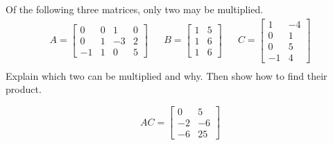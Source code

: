 
\begin{exerciseStatement}


Of the following three matrices, only two may be multiplied. 
\begin{align*} A= \left[\begin{array}{cccc}
0 & 0 & 1 & 0 \\
0 & 1 & -3 & 2 \\
-1 & 1 & 0 & 5
\end{array}\right]  & & B= \left[\begin{array}{cc}
1 & 5 \\
1 & 6 \\
1 & 6
\end{array}\right]  & & C= \left[\begin{array}{cc}
1 & -4 \\
0 & 1 \\
0 & 5 \\
-1 & 4
\end{array}\right]  \\ \end{align*}
             Explain which two can be multiplied and why. Then show how to find their product.


\end{exerciseStatement}
    
\begin{exerciseAnswer} 
\[AC= \left[\begin{array}{cc}
0 & 5 \\
-2 & -6 \\
-6 & 25
\end{array}\right] \]
\end{exerciseAnswer}
    
